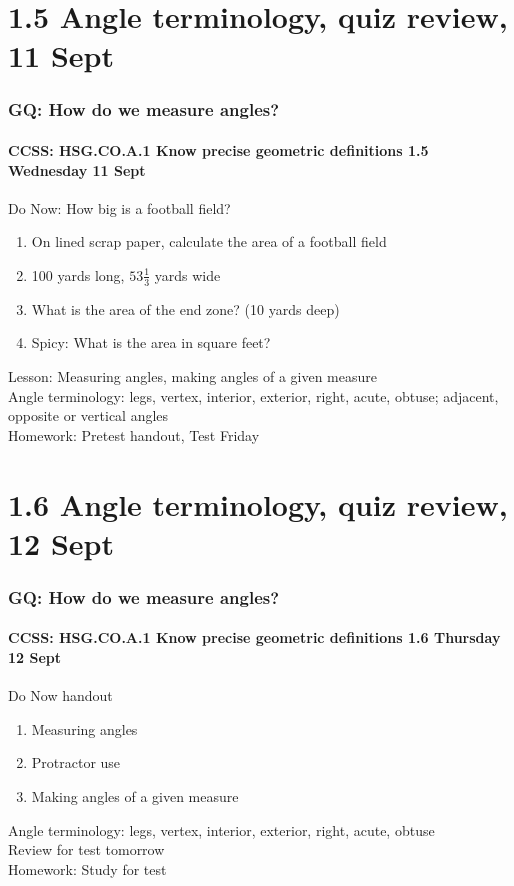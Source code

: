 \documentclass{beamer}
\begin{document}
\section{1.5 Angle terminology, quiz review, 11 Sept}
  \frame
  {
    \frametitle{GQ: How do we measure angles?}
    \framesubtitle{CCSS: HSG.CO.A.1 Know precise geometric definitions \hfill \alert{1.5 Wednesday 11 Sept}}
 
    \begin{block}{Do Now: How big is a football field?}
      \begin{enumerate}
          \item On lined scrap paper, calculate the area of a football field
          \item 100 yards long, $53 \frac{1}{3}$ yards wide
          \item What is the area of the end zone? (10 yards deep)
          \item Spicy: What is the area in square feet?
      \end{enumerate}
      \end{block}
    Lesson: Measuring angles, making angles of a given measure\\
    Angle terminology: legs, vertex, interior, exterior, right, acute, obtuse; adjacent, opposite or vertical angles\\ \vspace{0.5cm}
    Homework: Pretest handout, \alert{Test Friday}
  }
    
\section{1.6 Angle terminology, quiz review, 12 Sept}
\frame
{
  \frametitle{GQ: How do we measure angles?}
  \framesubtitle{CCSS: HSG.CO.A.1 Know precise geometric definitions \hfill \alert{1.6 Thursday 12 Sept}}
  \begin{block}{Do Now handout}
  \begin{enumerate}
      \item Measuring angles
      \item Protractor use
      \item Making angles of a given measure
  \end{enumerate}
  \end{block}
  Angle terminology: legs, vertex, interior, exterior, right, acute, obtuse\\
  Review for \alert{test tomorrow} \\
  Homework: Study for test
}
\end{document}
